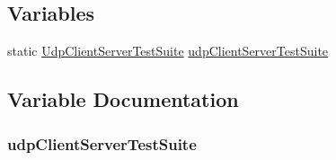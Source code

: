 \subsection*{Variables}
\begin{DoxyCompactItemize}
\item 
static \hyperlink{classUdpClientServerTestSuite}{Udp\+Client\+Server\+Test\+Suite} \hyperlink{udp-client-server-test_8cc_a29059297c0934eea1d0c8acac708d629}{udp\+Client\+Server\+Test\+Suite}
\end{DoxyCompactItemize}


\subsection{Variable Documentation}
\subsubsection[{\texorpdfstring{udp\+Client\+Server\+Test\+Suite}{udpClientServerTestSuite}}]{ udp\+Client\+Server\+Test\+Suite\hspace{0.3cm}{\ttfamily [static]}}\hypertarget{udp-client-server-test_8cc_a29059297c0934eea1d0c8acac708d629}{}\label{udp-client-server-test_8cc_a29059297c0934eea1d0c8acac708d629}

